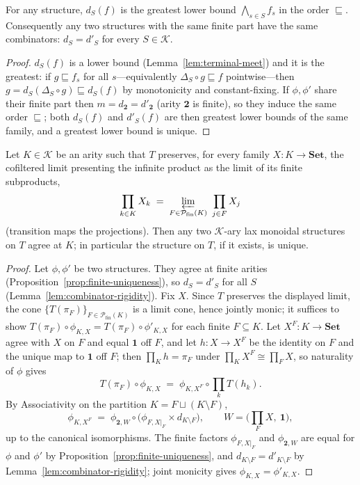 \begin{lemma}\label{lem:combinator-rigidity}
For any structure, $d_S(f)$ is the greatest lower bound $\bigwedge_{s\in S}f_s$ in the order $\sqsubseteq$. Consequently any two structures with the same finite part have the same combinators: $d_S=d'_S$ for every $S\in\mathcal{K}$.
\end{lemma}

\begin{proof}
$d_S(f)$ is a lower bound (Lemma~\ref{lem:terminal-meet}) and it is the greatest: if $g\sqsubseteq f_s$ for all $s$---equivalently $\Delta_S\circ g\sqsubseteq f$ pointwise---then $g=d_S(\Delta_S\circ g)\sqsubseteq d_S(f)$ by monotonicity and constant-fixing. If $\phi,\phi'$ share their finite part then $m=d_{\mathbf 2}=d'_{\mathbf 2}$ (arity $\mathbf 2$ is finite), so they induce the same order $\sqsubseteq$; both $d_S(f)$ and $d'_S(f)$ are then greatest lower bounds of the same family, and a greatest lower bound is unique.
\end{proof}

\begin{theorem}\label{thm:k-ary-uniqueness}
Let $K\in\mathcal{K}$ be an arity such that $T$ preserves, for every family $X\colon K\to\mathbf{Set}$, the cofiltered limit presenting the infinite product as the limit of its finite subproducts,
\[
  \prod_{k\in K}X_k\;=\;\varprojlim_{F\in\mathcal{P}_{\mathrm{fin}}(K)}\ \prod_{j\in F}X_j
\]
\textnormal{(}transition maps the projections\textnormal{)}. Then any two $\mathcal{K}$-ary lax monoidal structures on $T$ agree at $K$; in particular the structure on $T$, if it exists, is unique.
\end{theorem}

\begin{proof}
Let $\phi,\phi'$ be two structures. They agree at finite arities (Proposition~\ref{prop:finite-uniqueness}), so $d_S=d'_S$ for all $S$ (Lemma~\ref{lem:combinator-rigidity}). Fix $X$. Since $T$ preserves the displayed limit, the cone $\{T(\pi_F)\}_{F\in\mathcal{P}_{\mathrm{fin}}(K)}$ is a limit cone, hence jointly monic; it suffices to show $T(\pi_F)\circ\phi_{K,X}=T(\pi_F)\circ\phi'_{K,X}$ for each finite $F\subseteq K$. Let $X^{F}\colon K\to\mathbf{Set}$ agree with $X$ on $F$ and equal $\mathbf 1$ off $F$, and let $h\colon X\to X^{F}$ be the identity on $F$ and the unique map to $\mathbf 1$ off $F$; then $\prod_K h=\pi_F$ under $\prod_K X^{F}\cong\prod_F X$, so naturality of $\phi$ gives
\[
  T(\pi_F)\circ\phi_{K,X}\;=\;\phi_{K,X^{F}}\circ\textstyle\prod_k T(h_k).
\]
By Associativity on the partition $K=F\sqcup(K\setminus F)$,
\[
  \phi_{K,X^{F}}\;=\;\phi_{\mathbf 2,W}\circ\bigl(\phi_{F,X|_F}\times d_{K\setminus F}\bigr),\qquad W=\bigl(\textstyle\prod_F X,\ \mathbf 1\bigr),
\]
up to the canonical isomorphisms. The finite factors $\phi_{F,X|_F}$ and $\phi_{\mathbf 2,W}$ are equal for $\phi$ and $\phi'$ by Proposition~\ref{prop:finite-uniqueness}, and $d_{K\setminus F}=d'_{K\setminus F}$ by Lemma~\ref{lem:combinator-rigidity}; joint monicity gives $\phi_{K,X}=\phi'_{K,X}$.
\end{proof}

